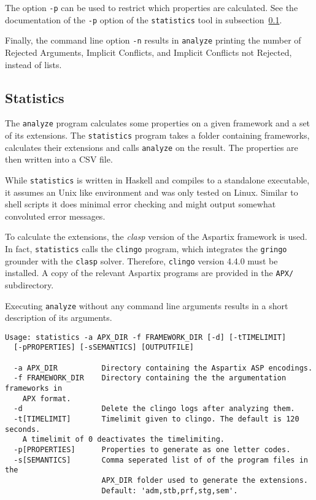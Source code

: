 \documentclass[parskip=half]{scrartcl}
\begin{document}
The option \texttt{-p} can be used to restrict which properties are
calculated. See the documentation of the \texttt{-p} option of the
\texttt{statistics} tool in subsection~\ref{statistics}.

Finally, the command line option \texttt{-n} results in \texttt{analyze}
printing the number of Rejected Arguments, Implicit Conflicts, and Implicit
Conflicts not Rejected, instead of lists.

\subsection{Statistics}
\label{statistics}

The \texttt{analyze} program calculates some properties on a given framework and
a set of its extensions. The \texttt{statistics} program takes a folder
containing frameworks, calculates their extensions and calls \texttt{analyze} on
the result. The properties are then written into a CSV file.

While \texttt{statistics} is written in Haskell and compiles to a standalone
executable, it assumes an Unix like environment and was only tested on Linux.
Similar to shell scripts it does minimal error checking and might output
somewhat convoluted error messages.

To calculate the extensions, the \emph{clasp} version of the Aspartix framework
is used.  In fact, \texttt{statistics} calls the \texttt{clingo} program, which
integrates the \texttt{gringo} grounder with the \texttt{clasp} solver. Therefore,
\texttt{clingo} version 4.4.0 must be installed.  A copy of the relevant
Aspartix programs are provided in the \texttt{APX/} subdirectory.

Executing \texttt{analyze} without any command line arguments results in a short
description of its arguments.
\begin{verbatim}
Usage: statistics -a APX_DIR -f FRAMEWORK_DIR [-d] [-tTIMELIMIT]
  [-pPROPERTIES] [-sSEMANTICS] [OUTPUTFILE]

  -a APX_DIR          Directory containing the Aspartix ASP encodings.
  -f FRAMEWORK_DIR    Directory containing the the argumentation frameworks in
    APX format.
  -d                  Delete the clingo logs after analyzing them.
  -t[TIMELIMIT]       Timelimit given to clingo. The default is 120 seconds.
    A timelimit of 0 deactivates the timelimiting.
  -p[PROPERTIES]      Properties to generate as one letter codes.
  -s[SEMANTICS]       Comma seperated list of of the program files in the
                      APX_DIR folder used to generate the extensions.
                      Default: 'adm,stb,prf,stg,sem'.
\end{verbatim}
\end{document}
